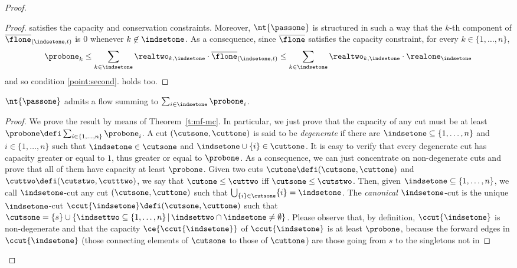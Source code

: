 \begin{proof}
\begin{varitemize}
\begin{proof}
      satisfies the capacity and conservation constraints. Moreover,
      $\nt{\passone}$ is structured in such a way that the $k$-th component
      of $\overline{\flone}_{(\indsetone,t)}$ is $0$ whenever
      $k\not\in\indsetone$. As a consequence, since $\overline{\flone}$
      satisfies the capacity constraint, for every $k\in\{1,\dots,n\}$,
      $$
      \probone_k \leq \sum_{k\in\indsetone}
      \realtwo_{k,\indsetone}\cdot\overline{\flone}_{(\indsetone,t)} \leq
      \sum_{k\in\indsetone} \realtwo_{k,\indsetone}\cdot\realone_\indsetone
      $$
      and so condition \ref{point:second}.  holds too.
    \end{proof}
  \item
    \begin{lemma}
      $\nt{\passone}$ admits a flow summing to
      $\sum_{i\in\indsetone}\probone_i$.
    \end{lemma}
    \begin{proof}
      We prove the result by means of Theorem~\ref{t:mf-mc}. In
      particular, we just prove that the capacity of any cut must be at least
      $\probone\defi\sum_{i\in\{1,\dots,n\}}\probone_i$.
      A cut $(\cutsone,\cuttone)$ is said to be \emph{degenerate}
      if there are $\indsetone\subseteq\{1,\dots,n\}$ and $i\in\{1,\dots,n\}$
      such that $\indsetone\in\cutsone$ and
      $\indsetone\cup\{i\}\in\cuttone$. It is easy to verify that every
      degenerate cut has capacity greater or equal to $1$, thus greater or
      equal to $\probone$. As a consequence, we can just concentrate on
      non-degenerate cuts and prove that all of them have capacity at least
      $\probone$. Given two cuts $\cutone\defi(\cutsone,\cuttone)$ and
      $\cuttwo\defi(\cutstwo,\cutttwo)$, we say that $\cutone\leq\cuttwo$ iff
      $\cutsone\leq\cutstwo$. Then, given $\indsetone\subseteq\{1,\dots,n\}$,
      we call $\indsetone$-cut any cut $(\cutsone,\cuttone)$ such that
      $\bigcup_{\{i\}\in\cutsone}\{i\}=\indsetone$. The \emph{canonical}
      $\indsetone$-cut is the unique $\indsetone$-cut
      $\ccut{\indsetone}\defi(\cutsone,\cuttone)$ such that
      $\cutsone=\{s\}\cup\{\indsettwo\subseteq\{1,\dots,n\}\,|\,\indsettwo\cap\indsetone\neq\emptyset\}$. Please
      observe that, by definition, $\ccut{\indsetone}$ is non-degenerate
      and that the capacity $\ce{\ccut{\indsetone}}$ of $\ccut{\indsetone}$
      is at least $\probone$, because the forward edges in
      $\ccut{\indsetone}$ (those connecting elements of $\cutsone$ to those
      of $\cuttone$) are those going from $s$ to the singletons not in

\end{proof}
\end{varitemize}
\end{proof}
